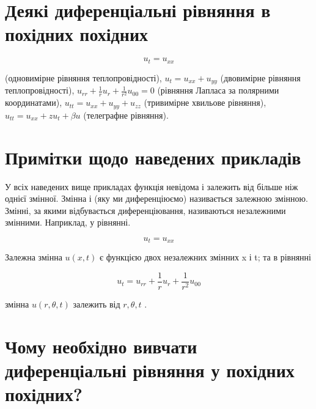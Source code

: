 \documentclass[
  ukrainian,
]{article}
\begin{document}
\section{Деякі диференціальні рівняння в похідних
похідних}\label{ux434ux435ux44fux43aux456-ux434ux438ux444ux435ux440ux435ux43dux446ux456ux430ux43bux44cux43dux456-ux440ux456ux432ux43dux44fux43dux43dux44f-ux432-ux43fux43eux445ux456ux434ux43dux438ux445-ux43fux43eux445ux456ux434ux43dux438ux445}

\[
u_t = u_{xx}
\]

(одновимірне рівняння теплопровідності), \(u_t = u_{xx} + u_{yy}\)
(двовимірне рівняння теплопровідності),
\(u_{rr} + \frac{1}{r}u_r + \frac{1}{r^2}u_{00} = 0\) (рівняння Лапласа
за полярними координатами), \(u_{tt} = u_{xx} + u_{yy} + u_{zz}\)
(тривимірне хвильове рівняння), \(u_{tt} = u_{xx} + zu_t + \beta u\)
(телеграфне рівняння).

\section{Примітки щодо наведених
прикладів}\label{ux43fux440ux438ux43cux456ux442ux43aux438-ux449ux43eux434ux43e-ux43dux430ux432ux435ux434ux435ux43dux438ux445-ux43fux440ux438ux43aux43bux430ux434ux456ux432}

У всіх наведених вище прикладах функція невідома і залежить від більше
ніж однієї змінної. Змінна і (яку ми диференціюємо) називається залежною
змінною. Змінні, за якими відбувається диференціювання, називаються
незалежними змінними. Наприклад, у рівнянні.

\[
u_t = u_{xx}
\]

Залежна змінна \(u(x, t)\) є функцією двох незалежних змінних x і t; та
в рівнянні

\[
u_t = u_{rr} + \frac{1}{r} u_r + \frac{1}{r^2} u_{00}
\]

змінна \(u(r, \theta, t)\) залежить від \(r, \theta, t\) .

\section{Чому необхідно вивчати диференціальні рівняння у похідних
похідних?}\label{ux447ux43eux43cux443-ux43dux435ux43eux431ux445ux456ux434ux43dux43e-ux432ux438ux432ux447ux430ux442ux438-ux434ux438ux444ux435ux440ux435ux43dux446ux456ux430ux43bux44cux43dux456-ux440ux456ux432ux43dux44fux43dux43dux44f-ux443-ux43fux43eux445ux456ux434ux43dux438ux445-ux43fux43eux445ux456ux434ux43dux438ux445}
\end{document}
